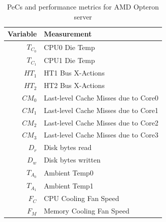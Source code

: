 \documentclass[acmtaco]{acmtrans2m}
\begin{document}
\begin{table}[t!]
  \caption{PeCs and performance metrics for AMD Opteron server}
  \label{tab:model}
  \centering
  \begin{tabular}{r l}
\hline
\textbf{Variable}&\textbf{Measurement}\\
\hline
$T_{C_{0}}$&CPU0 Die Temp\\
$T_{C_{1}}$&CPU1 Die Temp\\
$HT_{1}$&HT1 Bus X-Actions\\
$HT_{2}$&HT2 Bus X-Actions\\
$CM_{0}$&Last-level Cache Misses due to Core0\\
$CM_{1}$&Last-level Cache Misses due to Core1\\
$CM_{2}$&Last-level Cache Misses due to Core2\\
$CM_{3}$&Last-level Cache Misses due to Core3\\
$D_{r}$&Disk bytes read\\
$D_{w}$&Disk bytes written\\
$T_{A_{0}}$&Ambient Temp0\\
$T_{A_{1}}$&Ambient Temp1\\
$F_{C}$&CPU Cooling Fan Speed\\
$F_{M}$&Memory Cooling Fan Speed\\
\hline
  \end{tabular}
\end{table}
\end{document}
